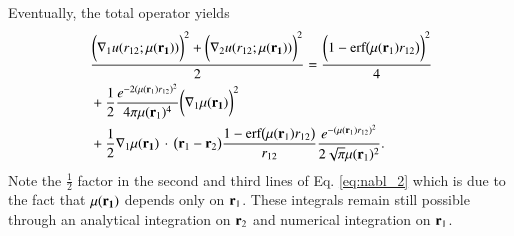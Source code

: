 \documentclass[aip,jcp,reprint,noshowkeys,superscriptaddress]{revtex4-1}
\newcommand{\bd}[1]{{\bf {#1}}}
\newcommand{\br}[0]{{\bf {r}}}
\newcommand{\bri}[1]{{\bf r}_{#1}}
\newcommand{\mur}[1]{\mu({\bf r_{#1}})}
\begin{document}
Eventually, the total operator yields
\begin{equation}
 \label{eq:nabl_2}
 \begin{aligned}
 & \frac{\bigg( \nabla_1  u(r_{12};\mur{1})\bigg)^2 + \bigg( \nabla_2  u(r_{12};\mur{1})\bigg)^2}{2} =  \frac{\bigg(1 - \text{erf}\big(\mu(\bri{1}) r_{12} \big)\bigg)^2}{4} \\
 &  +  \frac{1}{2}\frac{e^{-2(\mu(\bri{1}) r_{12})^2}}{4 \pi \mu(\bri{1})^4} \bigg( \nabla_1  \mur{1}\bigg)^2 \\ 
 &  +  \frac{1}{2} \nabla_1  \mur{1} \, \cdot \, \big( \br{}_1 - \br{}_2\big) \frac{1 - \text{erf}\big(\mu(\bri{1}) r_{12} \big)}{r_{12}} \frac{e^{-(\mu(\bri{1}) r_{12})^2}}{2 \sqrt{\pi}\mu(\bri{1})^2} .
 \end{aligned}
\end{equation}
Note the $\frac{1}{2}$ factor in the second and third lines of Eq. \eqref{eq:nabl_2} which is due to the fact that $\mur{1}$ depends only on $\bd{r}_1$. 
These integrals remain still possible through an analytical integration on $\bd{r}_2$ and numerical integration on $\bd{r}_1$. 
\end{document}
